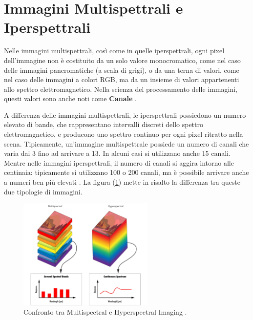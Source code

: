 
\section{Immagini Multispettrali e Iperspettrali}
Nelle immagini multispettrali, così come in quelle iperspettrali, ogni pixel 
dell’immagine non è costituito da un solo valore monocromatico, 
come nel caso delle immagini pancromatiche (a scala di grigi), o da una terna di valori, 
come nel caso delle immagini a colori RGB, ma da un insieme di valori appartenenti 
allo spettro elettromagnetico. 
Nella scienza del processamento delle immagini, questi valori sono
anche noti come \textbf{Canale} \cite{ALL6_REMOTE_SENSING,immagini_multispettrali2,immagini_multispettrale3,ALL2_REMOTE_SENSING}.

A differenza delle immagini multispettrali, le iperspettrali possiedono un numero elevato di bande, 
che rappresentano intervalli discreti dello spettro elettromagnetico, e producono uno spettro 
continuo per ogni pixel ritratto nella scena. Tipicamente, un'immagine multispettrale
possiede un numero di canali che varia dai 3 fino ad arrivare a 13. In alcuni casi si 
utilizzano anche 15 canali.
Mentre nelle immagini iperspettrali, il numero di canali si aggira intorno alle centinaia:
tipicamente si utilizzano 100 o 200 canali, ma è possibile arrivare anche a numeri ben 
più elevati
\cite{Immagini_multispettrali,immagini_multispettrali2,immagini_multispettrale3,ALL2_REMOTE_SENSING}.
\newpage
La figura (\ref{fig:Multy_vs_Hyper_spectral}) mette in risalto la differenza 
tra queste due tipologie di immagini.

\begin{figure}[H]
    \centering
    \includegraphics[width=0.60\textwidth]{Immagini/Generiche/Multy_vs_Hyper_spectral.png}
    \caption{ Confronto tra Multispectral e Hyperspectral Imaging \cite{Immagini_multispettrali}.}
    \label{fig:Multy_vs_Hyper_spectral}
\end{figure}

